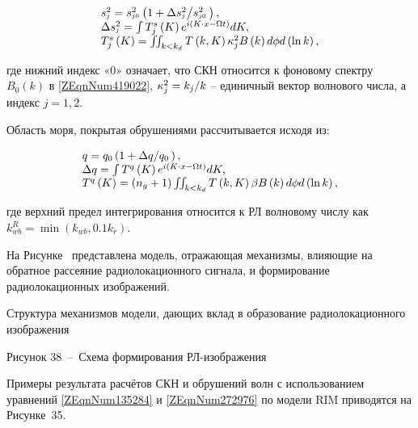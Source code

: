 \begin{equation} \label{1.44)} \begin{array}{l} {s_{^{j} }^{2} =s_{^{j0} }^{2} \left(1+{\Delta s_{^{j} }^{2} \mathord{\left/ {\vphantom {\Delta s_{^{j} }^{2}  s_{^{j0} }^{2} \, }} \right. \kern-\nulldelimiterspace} s_{^{j0} }^{2} \, } \right),} \\ {\Delta s_{^{j} }^{2} =\int T_{j}^{s} \left(K\right)e^{i\left(K\cdot x-\Omega t\right)}  dK,} \\ {T_{j}^{s} \left(K\right)=\iint \nolimits _{k<k_{d} }T\left(k,K\right)\kappa _{j}^{2} B\left(k\right) d\phi d\left(\ln k\right),} \end{array} \end{equation} 



где нижний индекс «0» означает, что СКН относится к фоновому спектру $B_{0} \left(k\right)$ в \eqref{ZEqnNum419022}, $\kappa _{j}^{2} ={k_{j} \mathord{\left/ {\vphantom {k_{j}  k}} \right. \kern-\nulldelimiterspace} k} $ -- единичный вектор волнового числа, а индекс $j=1,2$.

Область моря, покрытая обрушениями рассчитывается исходя из:



\begin{equation} \label{1.45)} \begin{array}{l} {q=q_{0} \left(1+{\Delta q\mathord{\left/ {\vphantom {\Delta q q_{0} \, }} \right. \kern-\nulldelimiterspace} q_{0} \, } \right),} \\ {\Delta q=\int T^{q} \left(K\right)e^{i\left(K\cdot x-\Omega t\right)}  dK,} \\ {T^{q} \left(K\right)=\left(n_{g} +1\right)\iint \nolimits _{k<k_{d} }T\left(k,K\right)\beta B\left(k\right) d\phi d\left(\ln k\right),} \end{array} \end{equation} 



где верхний предел интегрирования относится к РЛ волновому числу как $k_{wb}^{R} =\min \left(k_{wb} ,0.1k_{r} \right)$.

На Рисунке~ представлена модель, отражающая механизмы, влияющие на обратное рассеяние радиолокационного сигнала, и формирование радиолокационных изображений.







Структура механизмов модели, дающих вклад в образование радиолокационного изображения



Рисунок 38~--~Схема формирования РЛ-изображения



Примеры результата расчётов СКН и обрушений волн с использованием уравнений \eqref{ZEqnNum135284} и \eqref{ZEqnNum272976} по модели RIM приводятся на Рисунке~35.


